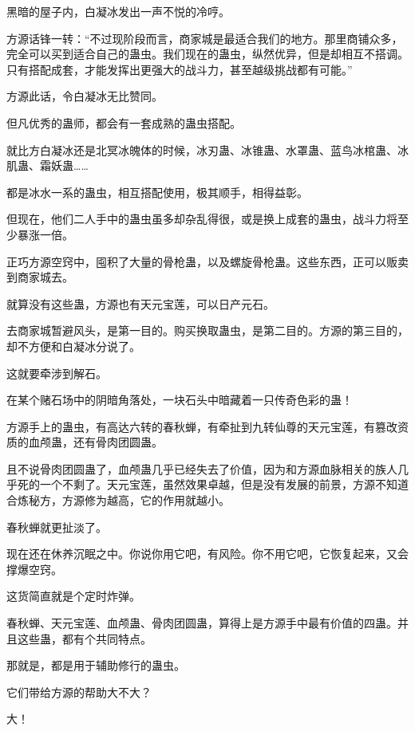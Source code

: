 
\begin{this_body}



黑暗的屋子内，白凝冰发出一声不悦的冷哼。

方源话锋一转：“不过现阶段而言，商家城是最适合我们的地方。那里商铺众多，完全可以买到适合自己的蛊虫。我们现在的蛊虫，纵然优异，但是却相互不搭调。只有搭配成套，才能发挥出更强大的战斗力，甚至越级挑战都有可能。”

方源此话，令白凝冰无比赞同。

但凡优秀的蛊师，都会有一套成熟的蛊虫搭配。

就比方白凝冰还是北冥冰魄体的时候，冰刃蛊、冰锥蛊、水罩蛊、蓝鸟冰棺蛊、冰肌蛊、霜妖蛊……

都是冰水一系的蛊虫，相互搭配使用，极其顺手，相得益彰。

但现在，他们二人手中的蛊虫虽多却杂乱得很，或是换上成套的蛊虫，战斗力将至少暴涨一倍。

正巧方源空窍中，囤积了大量的骨枪蛊，以及螺旋骨枪蛊。这些东西，正可以贩卖到商家城去。

就算没有这些蛊，方源也有天元宝莲，可以日产元石。

去商家城暂避风头，是第一目的。购买换取蛊虫，是第二目的。方源的第三目的，却不方便和白凝冰分说了。

这就要牵涉到解石。

在某个赌石场中的阴暗角落处，一块石头中暗藏着一只传奇色彩的蛊！

方源手上的蛊虫，有高达六转的春秋蝉，有牵扯到九转仙尊的天元宝莲，有篡改资质的血颅蛊，还有骨肉团圆蛊。

且不说骨肉团圆蛊了，血颅蛊几乎已经失去了价值，因为和方源血脉相关的族人几乎死的一个不剩了。天元宝莲，虽然效果卓越，但是没有发展的前景，方源不知道合炼秘方，方源修为越高，它的作用就越小。

春秋蝉就更扯淡了。

现在还在休养沉眠之中。你说你用它吧，有风险。你不用它吧，它恢复起来，又会撑爆空窍。

这货简直就是个定时炸弹。

春秋蝉、天元宝莲、血颅蛊、骨肉团圆蛊，算得上是方源手中最有价值的四蛊。并且这些蛊，都有个共同特点。

那就是，都是用于辅助修行的蛊虫。

它们带给方源的帮助大不大？

大！


\end{this_body}
